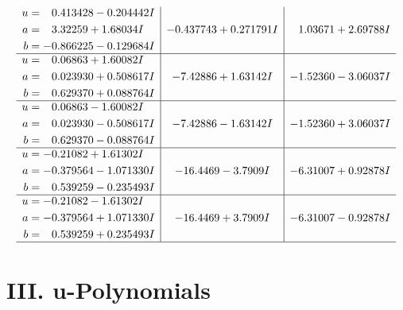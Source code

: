 \documentclass[1p]{elsarticle_modified}
\theoremstyle{definition}
\begin{document}
$$\begin{array}{c|c|c}
\begin{aligned}
u &= \phantom{-}0.413428 - 0.204442 I \\
a &= \phantom{-}3.32259 + 1.68034 I \\
b &= -0.866225 - 0.129684 I\end{aligned}
 & -0.437743 + 0.271791 I & \phantom{-}1.03671 + 2.69788 I \\ \hline\begin{aligned}
u &= \phantom{-}0.06863 + 1.60082 I \\
a &= \phantom{-}0.023930 + 0.508617 I \\
b &= \phantom{-}0.629370 + 0.088764 I\end{aligned}
 & -7.42886 + 1.63142 I & -1.52360 - 3.06037 I \\ \hline\begin{aligned}
u &= \phantom{-}0.06863 - 1.60082 I \\
a &= \phantom{-}0.023930 - 0.508617 I \\
b &= \phantom{-}0.629370 - 0.088764 I\end{aligned}
 & -7.42886 - 1.63142 I & -1.52360 + 3.06037 I \\ \hline\begin{aligned}
u &= -0.21082 + 1.61302 I \\
a &= -0.379564 - 1.071330 I \\
b &= \phantom{-}0.539259 - 0.235493 I\end{aligned}
 & -16.4469 - 3.7909 I & -6.31007 + 0.92878 I \\ \hline\begin{aligned}
u &= -0.21082 - 1.61302 I \\
a &= -0.379564 + 1.071330 I \\
b &= \phantom{-}0.539259 + 0.235493 I\end{aligned}
 & -16.4469 + 3.7909 I & -6.31007 - 0.92878 I\\
 \hline 
 \end{array}$$\newpage
\newpage\renewcommand{\arraystretch}{1}
\centering \section*{ III. u-Polynomials}
\end{document}
